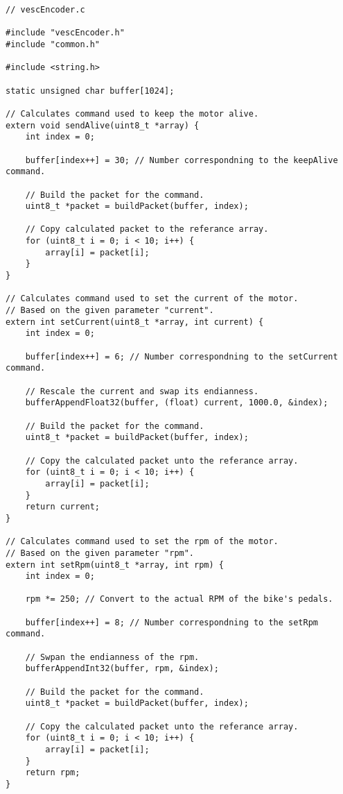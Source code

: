 \begin{lstlisting}[escapeinside=``]
// vescEncoder.c

#include "vescEncoder.h"
#include "common.h"

#include <string.h>

static unsigned char buffer[1024];

// Calculates command used to keep the motor alive.
extern void sendAlive(uint8_t *array) {
    int index = 0;

    buffer[index++] = 30; // Number correspondning to the keepAlive command.

    // Build the packet for the command.
    uint8_t *packet = buildPacket(buffer, index);

    // Copy calculated packet to the referance array.
	for (uint8_t i = 0; i < 10; i++) {
        array[i] = packet[i];
    }
}

// Calculates command used to set the current of the motor.
// Based on the given parameter "current".
extern int setCurrent(uint8_t *array, int current) {
	int index = 0;

	buffer[index++] = 6; // Number correspondning to the setCurrent command.

    // Rescale the current and swap its endianness.
	bufferAppendFloat32(buffer, (float) current, 1000.0, &index);

    // Build the packet for the command.
    uint8_t *packet = buildPacket(buffer, index);

    // Copy the calculated packet unto the referance array.
	for (uint8_t i = 0; i < 10; i++) {
        array[i] = packet[i];
    }
	return current;
}

// Calculates command used to set the rpm of the motor.
// Based on the given parameter "rpm".
extern int setRpm(uint8_t *array, int rpm) {
    int index = 0;

    rpm *= 250; // Convert to the actual RPM of the bike's pedals.

    buffer[index++] = 8; // Number correspondning to the setRpm command.

    // Swpan the endianness of the rpm.
    bufferAppendInt32(buffer, rpm, &index);
 
    // Build the packet for the command.
    uint8_t *packet = buildPacket(buffer, index);

    // Copy the calculated packet unto the referance array.
    for (uint8_t i = 0; i < 10; i++) {
        array[i] = packet[i];
    }
    return rpm;
}


\end{lstlisting}
